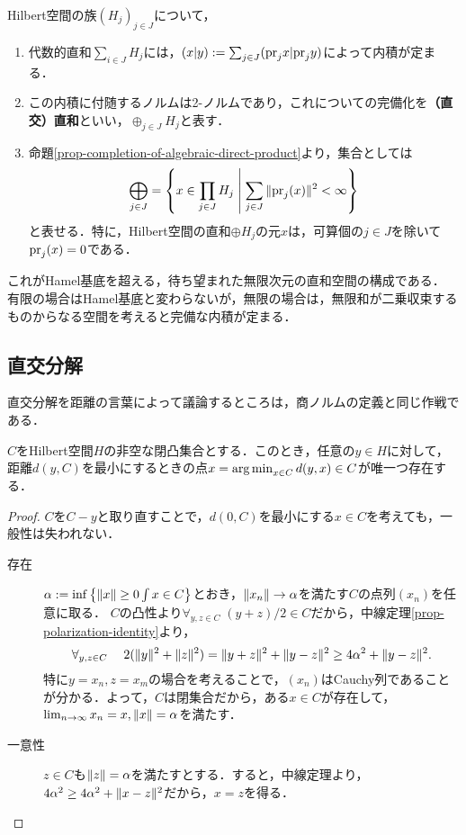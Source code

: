 \documentclass[uplatex,dvipdfmx]{jsreport}
\begin{document}
\begin{definition}\label{def-orthogonal-sum-of-Hilbert-spaces}
    Hilbert空間の族$(H_j)_{j\in J}$について，
    \begin{enumerate}
        \item 代数的直和$\sum_{i\in J}H_j$には，$(x|y):=\sum_{j\in J}(\mathrm{pr}_jx|\mathrm{pr}_jy)$によって内積が定まる．
        \item この内積に付随するノルムは2-ノルムであり，これについての完備化を\textbf{（直交）直和}といい，$\oplus_{j\in J}H_j$と表す．
        \item 命題\ref{prop-completion-of-algebraic-direct-product}より，集合としては
        \[\bigoplus_{j\in J}=\left\{x\in\prod_{j\in J}H_j\;\middle|\;\sum_{j\in J}\|\mathrm{pr}_j(x)\|^2<\infty\right\}\]
        と表せる．特に，Hilbert空間の直和$\oplus H_j$の元$x$は，可算個の$j\in J$を除いて$\mathrm{pr}_j(x)=0$である．
    \end{enumerate}
\end{definition}
\begin{remarks}
    これがHamel基底を超える，待ち望まれた無限次元の直和空間の構成である．
    有限の場合はHamel基底と変わらないが，無限の場合は，無限和が二乗収束するものからなる空間を考えると完備な内積が定まる．
\end{remarks}

\subsection{直交分解}

\begin{tcolorbox}[colframe=ForestGreen, colback=ForestGreen!10!white,breakable,colbacktitle=ForestGreen!40!white,coltitle=black,fonttitle=\bfseries\sffamily,
title=]
    直交分解を距離の言葉によって議論するところは，商ノルムの定義と同じ作戦である．
\end{tcolorbox}

\begin{lemma}
    $C$をHilbert空間$H$の非空な閉凸集合とする．このとき，任意の$y\in H$に対して，距離$d(y,C)$を最小にするときの点$x=\operatorname*{arg\,min}_{x\in C}d(y,x)\in C$が唯一つ存在する．
\end{lemma}
\begin{proof}
    $C$を$C-y$と取り直すことで，$d(0,C)$を最小にする$x\in C$を考えても，一般性は失われない．
    \begin{description}
        \item[存在] $\alpha:=\inf\left\{\|x\|\ge0\int x\in C\right\}$とおき，$\|x_n\|\to\alpha$を満たす$C$の点列$(x_n)$を任意に取る．
        $C$の凸性より$\forall_{y,z\in C}\;(y+z)/2\in C$だから，中線定理\ref{prop-polarization-identity}より，
        \[\forall_{y,z\in C}\;\quad2(\|y\|^2+\|z\|^2)=\|y+z\|^2+\|y-z\|^2\ge4\alpha^2+\|y-z\|^2.\]
        特に$y=x_n,z=x_m$の場合を考えることで，$(x_n)$はCauchy列であることが分かる．よって，$C$は閉集合だから，ある$x\in C$が存在して，$\lim_{n\to\infty}x_n=x,\|x\|=\alpha$を満たす．
        \item[一意性] $z\in C$も$\|z\|=\alpha$を満たすとする．すると，中線定理より，$4\alpha^2\ge4\alpha^2+\|x-z\|^2$だから，$x=z$を得る．
    \end{description}
\end{proof}
\end{document}
